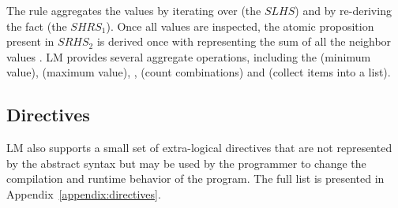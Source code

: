The rule aggregates the values  by iterating over
 (the $SLHS$) and by re-deriving the
fact  (the $SHRS_1$). Once all values
are inspected, the atomic proposition  present in $SRHS_2$
is derived once with  representing the sum of all the neighbor values
. LM provides several aggregate operations, including the
 (minimum value),  (maximum value), , 
(count combinations) and  (collect items into a list).

\subsection{Directives}

LM also supports a small set of extra-logical directives that are not
represented by the abstract syntax but may be used by the programmer to change
the compilation and runtime behavior of the program. The full list is presented
in Appendix~\ref{appendix:directives}.
